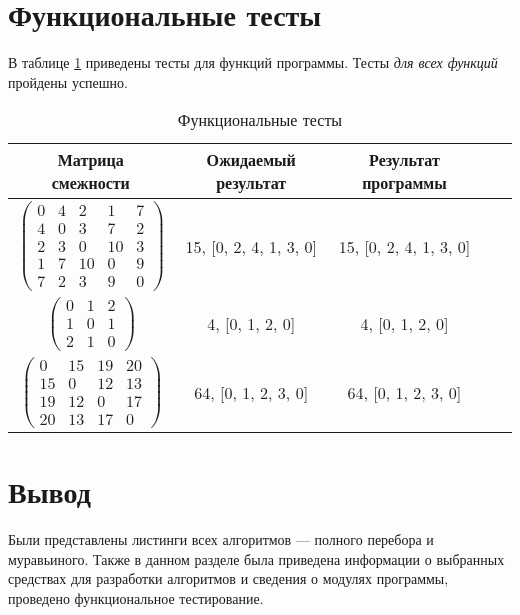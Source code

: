 \section{Функциональные тесты}

В таблице \ref{tbl:functional_test} приведены тесты для функций программы. Тесты \textit{для всех функций} пройдены успешно.

\begin{center}
	\captionsetup{justification=raggedright,singlelinecheck=off}
	\begin{longtable}[c]{|c|c|c|c|c|}
		\caption{Функциональные тесты\label{tbl:functional_test}} \\ \hline
		Матрица смежности & Ожидаемый результат & Результат программы \\
		\hline
		$ \begin{pmatrix}
			0 &  4 &  2 &  1 & 7 \\
			4 &  0 &  3 &  7 & 2 \\
			2 &  3 &  0 & 10 & 3 \\
			1 &  7 & 10 &  0 & 9 \\
			7 &  2 &  3 &  9 & 0
		\end{pmatrix}$ &
		15, [0, 2, 4, 1, 3, 0] &
		15, [0, 2, 4, 1, 3, 0] \\
		
		$ \begin{pmatrix}
			0 & 1 & 2 \\
			1 & 0 & 1 \\
			2 & 1 & 0	
		\end{pmatrix}$ &
		4, [0, 1, 2, 0] &
		4, [0, 1, 2, 0] \\
		
		$ \begin{pmatrix}
			0 & 15 & 19 & 20 \\
			15 &  0 & 12 & 13 \\
			19 & 12 &  0 & 17 \\
			20 & 13 & 17 &  0
		\end{pmatrix}$ &
		64, [0, 1, 2, 3, 0] &
		64, [0, 1, 2, 3, 0] \\
		\hline
	\end{longtable}
\end{center}

\section{Вывод}

Были представлены листинги всех алгоритмов --- полного перебора и муравьиного. Также в данном разделе была приведена информации о выбранных средствах для разработки алгоритмов и сведения о модулях программы, проведено функциональное тестирование.
